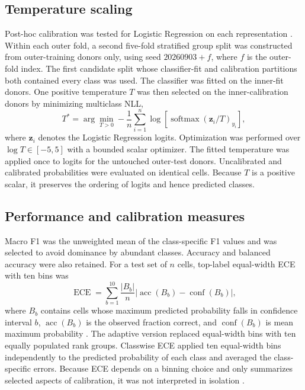 \subsection{Temperature scaling}

Post-hoc calibration was tested for Logistic Regression on each representation \citep{Guo2017}. Within each outer fold, a second five-fold stratified group split was constructed from outer-training donors only, using seed $20260903+f$, where $f$ is the outer-fold index. The first candidate split whose classifier-fit and calibration partitions both contained every class was used. The classifier was fitted on the inner-fit donors. One positive temperature $T$ was then selected on the inner-calibration donors by minimizing multiclass NLL,
\begin{equation}
T^{*}=\arg\min_{T>0}-\frac{1}{n}\sum_{i=1}^{n}\log\left[\operatorname{softmax}\left(\mathbf{z}_{i}/T\right)_{y_i}\right],
\end{equation}
where $\mathbf{z}_i$ denotes the Logistic Regression logits. Optimization was performed over $\log T\in[-5,5]$ with a bounded scalar optimizer. The fitted temperature was applied once to logits for the untouched outer-test donors. Uncalibrated and calibrated probabilities were evaluated on identical cells. Because $T$ is a positive scalar, it preserves the ordering of logits and hence predicted classes.

\subsection{Performance and calibration measures}

Macro F1 was the unweighted mean of the class-specific F1 values and was selected to avoid dominance by abundant classes. Accuracy and balanced accuracy were also retained. For a test set of $n$ cells, top-label equal-width ECE with ten bins was
\begin{equation}
\operatorname{ECE}=\sum_{b=1}^{10}\frac{|B_b|}{n}\left|\operatorname{acc}(B_b)-\operatorname{conf}(B_b)\right|,
\end{equation}
where $B_b$ contains cells whose maximum predicted probability falls in confidence interval $b$, $\operatorname{acc}(B_b)$ is the observed fraction correct, and $\operatorname{conf}(B_b)$ is mean maximum probability \citep{Naeini2015,Guo2017}. The adaptive version replaced equal-width bins with ten equally populated rank groups. Classwise ECE applied ten equal-width bins independently to the predicted probability of each class and averaged the class-specific errors. Because ECE depends on a binning choice and only summarizes selected aspects of calibration, it was not interpreted in isolation \citep{Vaicenavicius2019,SilvaFilho2023}.

